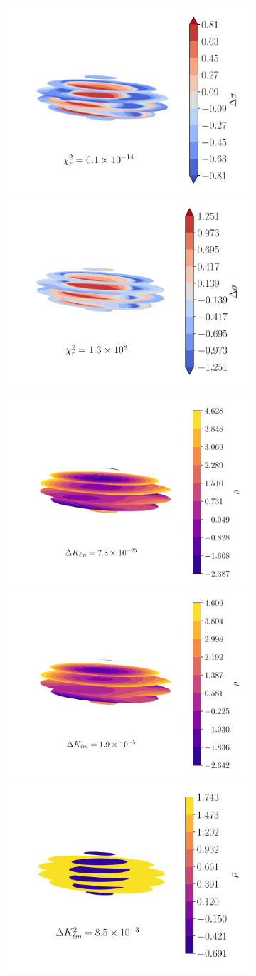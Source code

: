 \documentclass[fleqn,usenatbib]{mnras}
\begin{document}
{\begin{landscape}
\begin{figure}
\begin{subfigure}{0.49\linewidth}
        \includegraphics[width=0.33\linewidth]{figs/in-rat-likelihood.pdf}\hfill
        \includegraphics[width=0.33\linewidth]{figs/in-rat-harmonic.pdf}\hfill
        \hspace{0.33\linewidth}
      \end{subfigure}\hfill
      \begin{subfigure}{0.49\linewidth}
        \centering
        \includegraphics[width=0.33\linewidth]{figs/out-likelihood.pdf}\hfill
        \includegraphics[width=0.33\linewidth]{figs/out-harmonic.pdf}\hfill
        \includegraphics[width=0.33\linewidth]{figs/out-lumpy.pdf}


\end{subfigure}
\end{figure}
\end{landscape}}
\end{document}
